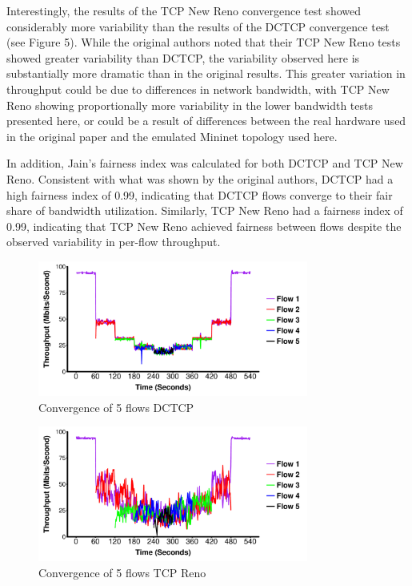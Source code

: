 Interestingly, the results of the TCP New Reno convergence test showed considerably more variability than the results of the DCTCP convergence test (see Figure 5). While the original authors noted that their TCP New Reno tests showed greater variability than DCTCP, the variability observed here is substantially more dramatic than in the original results. This greater variation in throughput could be due to differences in network bandwidth, with TCP New Reno showing proportionally more variability in the lower bandwidth tests presented here, or could be a result of differences between the real hardware used in the original paper and the emulated Mininet topology used here.

In addition, Jain's fairness index was calculated for both DCTCP and TCP New Reno. Consistent with what was shown by the original authors, DCTCP had a high fairness index of 0.99, indicating that DCTCP flows converge to their fair share of bandwidth utilization. Similarly, TCP New Reno had a fairness index of 0.99, indicating that TCP New Reno achieved fairness between flows despite the observed variability in per-flow throughput. 

\begin{figure}
\includegraphics[height=1.75in,width=3.5in]{dctcp_converg}
\caption{Convergence of 5 flows DCTCP}
\end{figure}

\begin{figure}
\includegraphics[height=1.75in,width=3.5in]{reno_converg}
\caption{Convergence of 5 flows TCP Reno}
\end{figure}

